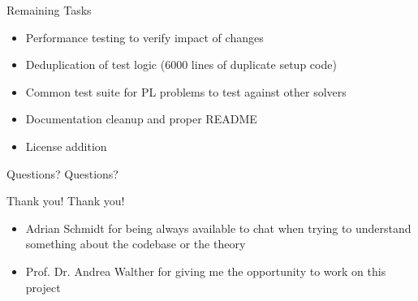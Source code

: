 \documentclass[aspectratio=169]{beamer}
\begin{document}
\begin{frame}{Remaining Tasks}
    \begin{itemize}[<+->]
        \item Performance testing to verify impact of changes
        \item Deduplication of test logic (6000 lines of duplicate setup code)
        \item Common test suite for PL problems to test against other solvers
        \item Documentation cleanup and proper README
        \item License addition
    \end{itemize}

\end{frame}

\begin{frame}{Questions?}
    \centering
    \vspace{2cm}
    \Huge Questions?
    \vspace{2cm}
\end{frame}

\begin{frame}{Thank you!}
    \centering
    \vspace{1cm}
    \Huge Thank you!
    \vspace{0.5cm}

    \large
    \begin{itemize}
        \item Adrian Schmidt for being always available to chat when trying to
              understand something about the codebase or the theory
        \item Prof. Dr. Andrea Walther for giving me the opportunity to work on
              this project
    \end{itemize}
    \vspace{1cm}
\end{frame}
\end{document}
